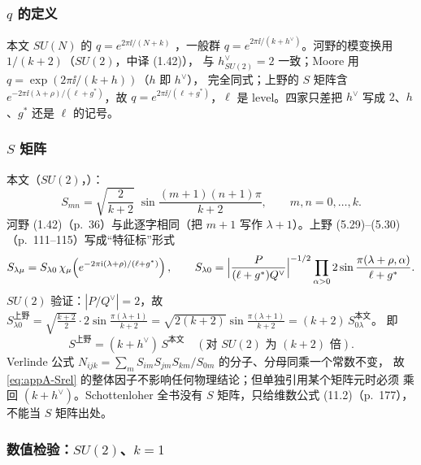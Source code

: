 \subsubsection*{$q$ 的定义}

本文 $SU(N)$ 的 $q=e^{2\pi\ii/(N+k)}$ ，一般群
$q=e^{2\pi\ii/(k+h^\vee)}$。河野的模变换用 $1/(k+2)$（$SU(2)$，中译 (1.42)），
与 $h^\vee_{SU(2)}=2$ 一致；Moore 用 $q=\exp(2\pi\ii/(k+h))$（$h$ 即 $h^\vee$），
完全同式；上野的 $S$ 矩阵含 $e^{-2\pi\ii(\lambda+\rho)/(\ell+g^*)}$，故
$q=e^{2\pi\ii/(\ell+g^*)}$，$\ell$ 是 level。四家只差把 $h^\vee$ 写成 $2$、$h$、$g^*$
还是 $\ell$ 的记号。

\subsubsection*{$S$ 矩阵}

本文（$SU(2)$，）：
\begin{equation}
S_{mn}=\sqrt{\frac{2}{k+2}}\;\sin\frac{(m+1)(n+1)\pi}{k+2},
\qquad m,n=0,\dots,k .
\label{eq:appA-S}
\end{equation}
河野 (1.42)（p.~36）与此逐字相同（把 $m+1$ 写作 $\lambda+1$）。上野
(5.29)--(5.30)（p.~111--115）写成“特征标”形式
\begin{equation}
S_{\lambda\mu}=S_{\lambda0}\,\chi_\mu\!\left(e^{-2\pi\mathrm{i}(\lambda+\rho)/(\ell+g^*)}\right),
\qquad
S_{\lambda0}=\Bigl|\frac{P}{(\ell+g^*)Q^\vee}\Bigr|^{-1/2}
\prod_{\alpha>0}2\sin\frac{\pi(\lambda+\rho,\alpha)}{\ell+g^*} .
\label{eq:appA-Sueno}
\end{equation}
$SU(2)$ 验证：$|P/Q^\vee|=2$，故
$S_{\lambda0}^{\text{上野}}=\sqrt{\tfrac{k+2}{2}}\cdot 2\sin\frac{\pi(\lambda+1)}{k+2}
=\sqrt{2(k+2)}\sin\frac{\pi(\lambda+1)}{k+2}=(k+2)\,S_{0\lambda}^{\text{本文}}$。
即
\begin{equation}
S^{\text{上野}}=(k+h^\vee)\,S^{\text{本文}}\quad(\text{对 }SU(2)\text{ 为 }(k+2)\text{ 倍}).
\label{eq:appA-Srel}
\end{equation}
Verlinde 公式
$N_{ijk}=\sum_m S_{im}S_{jm}S_{km}/S_{0m}$ 的分子、分母同乘一个常数不变，
故 \eqref{eq:appA-Srel} 的整体因子不影响任何物理结论；但单独引用某个矩阵元时必须
乘回 $(k+h^\vee)$。Schottenloher 全书没有 $S$ 矩阵，只给维数公式 (11.2)（p.~177），
不能当 $S$ 矩阵出处。

\subsubsection*{数值检验：$SU(2)$、$k=1$}

